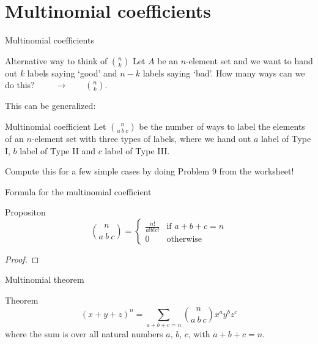 \documentclass{beamer}
\def\bl[#1]#2{\begin{block}{#1}#2\end{block}}
\begin{document}
\section{Multinomial coefficients}
\begin{frame}{Multinomial coefficients}
\bl[Alternative way to think of $\binom{n}{k}$]{
Let $A$ be an $n$-element set and we want to hand out $k$ labels saying `good' and $n-k$ labels saying `bad'. How many ways can we do this? $\qquad\to\qquad\binom{n}{k}$.
}
This can be generalized:
\bl[Multinomial coefficient]{
Let $\binom{n}{a~b~c}$ be the number of ways to label the elements of an $n$-element set with three types of labels, where we hand out $a$ label of Type I, $b$ label of Type II and $c$ label of Type III.
}
Compute this for a few simple cases by doing Problem 9 from the worksheet!
\end{frame}

\begin{frame}{Formula for the multinomial coefficient}
\bl[Propositon]{
\[
\binom{n}{a~b~c}=\left\{\begin{array}{cc}
\frac{n!}{a!b!c!}&\textrm{if }a+b+c=n\\
0&\textrm{otherwise}
\end{array}\right.
\]
}
\begin{proof}


\end{proof}
\end{frame}

\begin{frame}{Multinomial theorem}
\bl[Theorem]{
\[
(x+y+z)^n=\sum_{a+b+c=n}\binom{n}{a~b~c}x^ay^bz^c
\]
where the sum is over all natural numbers $a$, $b$, $c$, with $a+b+c=n$.
}
\end{frame}
\end{document}
